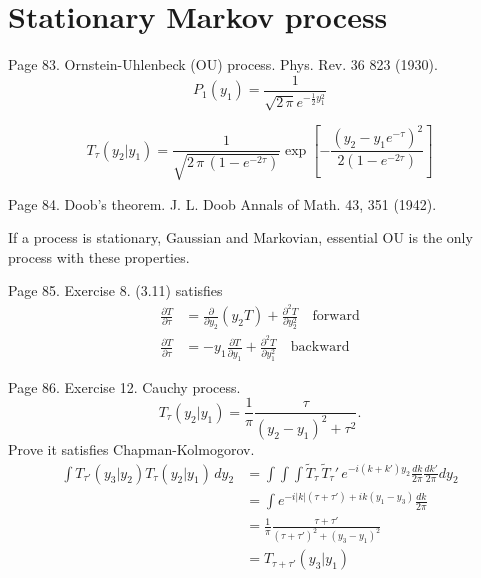 \documentclass{book}
\numberwithin{equation}{section}
\theoremstyle{plain}
\theoremstyle{definition}
\theoremstyle{remark}
\theoremstyle{BoldStyle}
\numberwithin{exercise}{section}
\begin{document}
\section{Stationary Markov process}

Page 83.
Ornstein-Uhlenbeck (OU) process.
Phys. Rev. 36 823 (1930).
\begin{equation}
P_1(y_1)
=
\frac{1}{\sqrt{2 \, \pi} e^{-\frac 1 2 y_1^2 } }
\tag{3.10}
\end{equation}

\begin{equation}
  T_\tau(y_2 | y_1)
=
\frac{ 1 } { \sqrt{ 2 \, \pi \, (1 - e^{-2\tau}) }  }
\exp\left[
  -\frac{ (y_2 - y_1 e^{-\tau})^2 }
  { 2 ( 1 - e^{-2 \tau } ) }
\right]
\tag{3.11}
\end{equation}

Page 84.
Doob's theorem.
J. L. Doob Annals of Math. 43, 351 (1942).

If a process is stationary, Gaussian and Markovian,
essential OU is the only process with these properties.

Page 85.
Exercise 8. (3.11) satisfies
\begin{align}
\frac{ \partial T } { \partial \tau }
&=
\frac{ \partial } { \partial y_2 } \left( y_2 T \right)
+
\frac{ \partial^2 T } { \partial y_2^2 }
\quad \mathrm{forward}
\tag{3.20}
\\
\frac{ \partial T } { \partial \tau }
&=
-y_1 \frac{ \partial T } { \partial y_1 }
+
\frac{ \partial^2 T } { \partial y_1^2 }
\quad \mathrm{backward}
\tag{3.21}
\end{align}


Page 86.
Exercise 12.
Cauchy process.
\begin{equation}
  T_\tau(y_2|y_1)
  =
  \frac{1}{\pi}
  \frac{ \tau } { (y_2 - y_1)^2 + \tau^2 }.
\end{equation}
Prove it satisfies Chapman-Kolmogorov.
$$
\begin{aligned}
\int T_{\tau'}(y_3|y_2) T_\tau(y_2|y_1) \, dy_2
&=
\int \int \int \tilde T_\tau \, \tilde T_\tau' \,
e^{-i(k + k') y_2 } \frac{dk}{2\pi} \frac{dk'}{2\pi} dy_2
\\
&=
\int e^{ -i|k| (\tau +\tau') + ik (y_1 -y_3) } \frac{dk}{2\pi}
\\
&=
\frac{1}{\pi}
\frac{ \tau + \tau'}
{ (\tau + \tau')^2 + (y_3 - y_1)^2 } \\
&=
T_{\tau + \tau'}(y_3 | y_1) \\
\end{aligned}
$$
\end{document}
